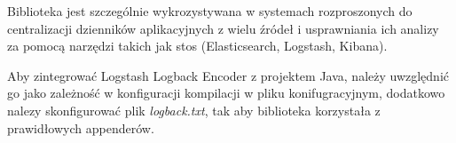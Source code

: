 Biblioteka jest szczególnie wykrozystywana w systemach rozproszonych do centralizacji dzienników aplikacyjnych z wielu źródeł i usprawniania ich analizy za pomocą narzędzi takich jak stos  (Elasticsearch, Logstash, Kibana)\cite{logstashLogbackEncoderOverview}.

Aby zintegrować Logstash Logback Encoder z projektem Java, należy uwzględnić go jako zależność w konfiguracji kompilacji w pliku konifugracyjnym, dodatkowo nalezy skonfigurować plik \textit{logback.txt}, tak aby biblioteka korzystała z prawidłowych appenderów\cite{logstashLogbackEncoderOverview}.